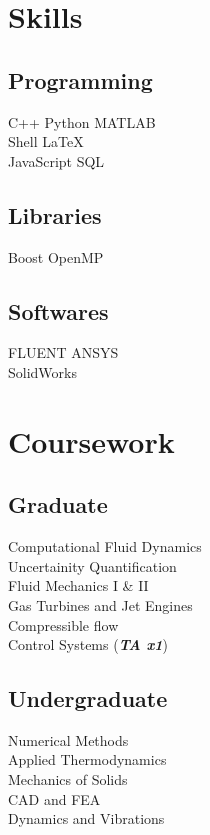 \documentclass[]{resume}
\begin{document}
\begin{minipage}[t]{0.33\textwidth}

\section{Skills}
\subsection{Programming}
C++ \textbullet{} Python \textbullet{} MATLAB \\
Shell \textbullet{} \LaTeX\ \\
JavaScript \textbullet{} SQL \\
\sectionsep
\subsection{Libraries}
Boost \textbullet{} OpenMP \\
\sectionsep
\subsection{Softwares}
FLUENT \textbullet{} ANSYS \textbullet{} \\
SolidWorks \\
\sectionsep


\section{Coursework}
\subsection{Graduate}
Computational Fluid Dynamics \\
Uncertainity Quantification \\
Fluid Mechanics I \& II \\
Gas Turbines and Jet Engines \\
Compressible flow \\
Control Systems (\textbf{\textit{TA x1}}) \\
\sectionsep

\subsection{Undergraduate}
Numerical Methods \\
Applied Thermodynamics \\
Mechanics of Solids \\
CAD and FEA \\
Dynamics and Vibrations \\

%
%

\end{minipage}
\end{document}
